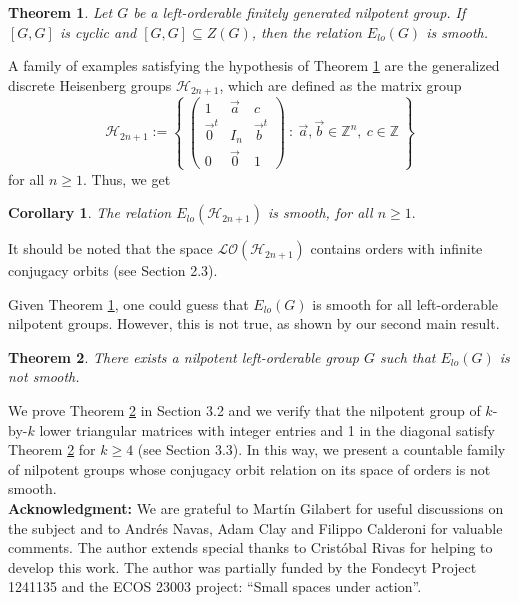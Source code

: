 \documentclass[12pt]{article}
\newtheorem{thm}{Theorem}
\newtheorem{coro}{Corollary}
\theoremstyle{definition}
\begin{document}
\begin{thm}
\label{thmsmooth}
    Let $G$ be a left-orderable finitely generated nilpotent group. If $[G,G]$ is cyclic and $[G,G]\subseteq Z(G)$, then the relation $E_{lo}(G)$ is smooth.
\end{thm}

A family of examples satisfying the hypothesis of Theorem \ref{thmsmooth} are the generalized discrete Heisenberg groups $\mathcal{H}_{2n+1}$, which are defined as the matrix group
$$\mathcal{H}_{2n+1}:=\left \{\ \left( \begin{array}{ccc}
1 & \vec{a} & c\\
\vec{0}^t & I_n & \vec{b}^t\\
0 & \vec{0} & 1  
\end{array} \right )\ :\ \vec{a},\vec{b}\in \mathbb{Z}^n,\ c\in\mathbb{Z}\ \right \}$$
for all $n\geq1.$ Thus, we get 

\begin{coro}
    The relation $E_{lo}(\mathcal{H}_{2n+1})$ is smooth, for all $n\geq1.$
\end{coro}

It should be noted that the space $\mathcal{LO}(\mathcal{H}_{2n+1})$ contains orders with infinite conjugacy {\color{violet}orbits} (see Section 2.3). %

Given Theorem \ref{thmsmooth}, one could guess that $E_{lo}(G)$ is smooth for all left-orderable nilpotent groups. However, this is not true{\color{violet},} as shown by our second main result.

\begin{thm}
\label{nosmooth}
    There exists a nilpotent left-orderable group $G$ such that $E_{lo}(G)$ is not smooth.
\end{thm}

We prove Theorem \ref{nosmooth} in Section 3.2 and we verify that the nilpotent group of $k$-by-$k$ lower triangular matrices with integer entries
and 1 in the diagonal satisfy Theorem \ref{nosmooth} for $k\geq 4$ (see Section 3.3). In this way, we present a countable family of nilpotent groups whose conjugacy orbit relation on its space of orders is not smooth.\\  

\noindent\textbf{Acknowledgment:} We are grateful to Martín Gilabert for useful discussions on the subject and to Andrés Navas, Adam Clay and Filippo Calderoni for valuable comments. The author extends special thanks to Cristóbal Rivas for helping to develop this work.
The author was partially funded by the Fondecyt Project 1241135 and the ECOS 23003 project:
``Small spaces under action''.
\end{document}
